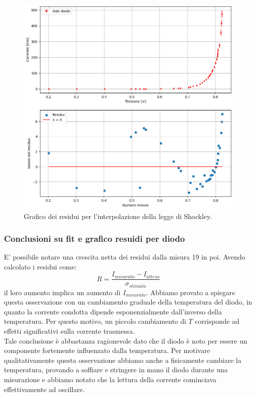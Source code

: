 \documentclass[letterpaper,12pt]{article}
\begin{document}
\begin{figure}[h!]
    \centering
    \includegraphics[width=.8\textwidth]{Residui.png}
    \caption{Grafico dei residui per l'interpolazione della legge di Shockley.}
    \label{fig:residui_shockley}
\end{figure}
\newpage
\vspace{40pt}
\subsubsection{Conclusioni su fit e grafico resuidi per diodo}


E' possibile notare una crescita netta dei residui dalla misura 19 in poi. Avendo calcolato i residui come:
$$
R = \frac{I_{misurato} - I_{atteso}}{\sigma_{stimata}}
$$
il loro aumento implica un aumento di $I_{misurato}$. Abbiamo provato a spiegare questa osservazione con un cambiamento graduale della temperatura del diodo, in quanto la corrente condotta dipende esponenzialmente dall'inverso della temperatura. Per questo motivo, un piccolo cambiamento di $T$ corrisponde ad effetti significativi sulla corrente trasmessa. \\
Tale conclusione è abbastanza ragionevole dato che il diodo è noto per essere un componente fortemente influenzato dalla temperatura. 
Per motivare qualitativamente questa osservazione abbiamo anche a fisicamente cambiare la temperatura, provando a soffiare e stringere in mano il diodo durante una misurazione e abbiamo notato che la lettura della corrente cominciava effettivamente ad oscillare.
\end{document}

